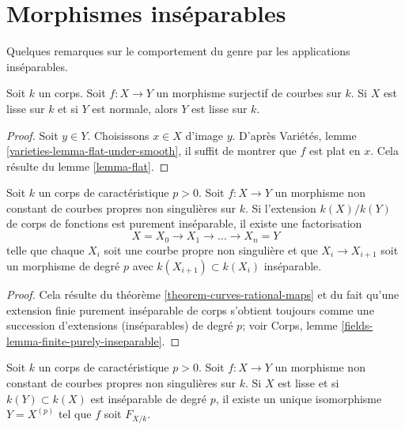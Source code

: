 \section{Morphismes inséparables}
\label{section-inseparable}

\noindent
Quelques remarques sur le comportement du genre par les applications inséparables.

\begin{lemma}
\label{lemma-dominated-by-smooth}
Soit $k$ un corps. Soit $f : X \to Y$ un morphisme surjectif de courbes sur $k$. Si $X$ est lisse sur $k$ et si $Y$ est normale, alors $Y$ est lisse sur $k$.
\end{lemma}

\begin{proof}
Soit $y \in Y$. Choisissons $x \in X$ d'image $y$. D'après Variétés, lemme \ref{varieties-lemma-flat-under-smooth}, il suffit de montrer que $f$ est plat en $x$. Cela résulte du lemme \ref{lemma-flat}.
\end{proof}

\begin{lemma}
\label{lemma-purely-inseparable}
Soit $k$ un corps de caractéristique $p > 0$. Soit $f : X \to Y$ un morphisme non constant de courbes propres non singulières sur $k$. Si l'extension $k(X)/k(Y)$ de corps de fonctions est purement inséparable, il existe une factorisation $$
X = X_0 \to X_1 \to \ldots \to X_n = Y
$$ telle que chaque $X_i$ soit une courbe propre non singulière et que $X_i \to X_{i + 1}$ soit un morphisme de degré $p$ avec $k(X_{i + 1}) \subset k(X_i)$ inséparable.
\end{lemma}

\begin{proof}
Cela résulte du théorème \ref{theorem-curves-rational-maps} et du fait qu'une extension finie purement inséparable de corps s'obtient toujours comme une succession d'extensions (inséparables) de degré $p$; voir Corps, lemme \ref{fields-lemma-finite-purely-inseparable}.
\end{proof}

\begin{lemma}
\label{lemma-inseparable-deg-p-smooth}
Soit $k$ un corps de caractéristique $p > 0$. Soit $f : X \to Y$ un morphisme non constant de courbes propres non singulières sur $k$. Si $X$ est lisse et si $k(Y) \subset k(X)$ est inséparable de degré $p$, il existe un unique isomorphisme $Y = X^{(p)}$ tel que $f$ soit $F_{X/k}$.
\end{lemma}

